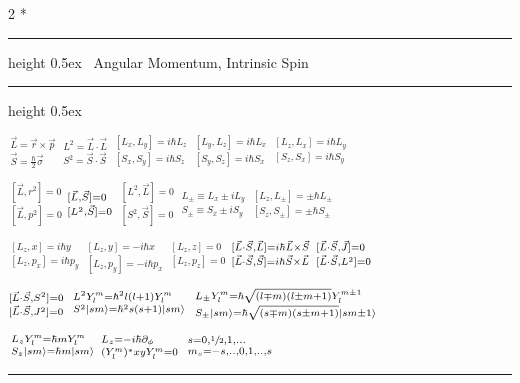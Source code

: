 \documentclass{article}
\makeatletter
\def\HrulefillThin{\leavevmode\leaders\hrule height 0.5ex \hfill\kern\z@}
\newcommand{\YgorUD}[2]{\,\!^{#1}_{#2}}
\renewcommand{\subsection}[1]{%
     \@startsection{subsection}{2}{0mm}{0.01ex}{0.01ex}{%
         \normalfont\Large\bfseries }*{%
         \noindent\HrulefillThin%
              ~#1~\HrulefillThin}}
\makeatother
\begin{document}
\begin{multicols}{2}
\subsection{Angular Momentum, Intrinsic Spin}

$\, ^{\vec{L}=\vec{r}\times\vec{p}}%
     _{\vec{S}=\frac{\hbar}{2}\vec{\sigma}}$%
    \hfill\textbullet\hfill%
    $\, ^{L^{ 2} =\vec{L}\cdot\vec{L}}%
     _{S^{ 2} =\vec{S}\cdot\vec{S}}$%
    \hfill\textbullet\hfill%
    $\, ^{[ L_{ x} ,L_{ y} ]=i\hbar L_{ z}}%
         _{[ S_{ x} ,S_{ y} ]=i\hbar S_{ z}}$%
    \hfill\textbullet\hfill%
    $\, ^{[ L_{ y} ,L_{ z} ]=i\hbar L_{ x}}%
         _{[ S_{ y} ,S_{ z} ]=i\hbar S_{ x}}$%
    \hfill\textbullet\hfill%
    $\, ^{[ L_{ z} ,L_{ x} ]=i\hbar L_{ y}}%
         _{[ S_{ z} ,S_{ x} ]=i\hbar S_{ y}}$
 
$\, ^{[ \vec{L} ,r^{ 2} ]=0}%
     _{[ \vec{L} ,p^{ 2} ]=0}$%
    \hfill\textbullet\hfill%
    $\YgorUD{[ \vec{L} ,\vec{S}]= 0}{%
         [ L^{ 2} ,\vec{S}]= 0}$%
    \hfill\textbullet\hfill%
    $\, ^{[ L^{ 2}  ,\vec{L}]=0}%
         _{[ S^{ 2}  ,\vec{S}]=0}$%
    \hfill\textbullet\hfill%
    $\, ^{L_{ \pm}\equiv L_{ x} \pm i L_{ y}}%
         _{S_{ \pm}\equiv S_{ x} \pm i S_{ y}}$%
    \hfill\textbullet\hfill%
    $\, ^{[ L_{ z} ,L_{ \pm} ]=\pm\hbar L_{ \pm}}%
         _{[ S_{ z} ,S_{ \pm} ]=\pm\hbar S_{ \pm}}$

$\, ^{[ L_{ z} ,x ]=i\hbar y}%
         _{[ L_{ z} ,p_{ x} ]=i\hbar p_{ y}}   $%
    \hfill\textbullet\hfill%
    $\, ^{[ L_{ z} ,y ]=- i\hbar x}%
         _{[ L_{ z} ,p_{ y} ]=- i\hbar p_{ x}}   $%
    \hfill\textbullet\hfill%
    $\, ^{[ L_{ z} ,z ]=0}%
         _{[ L_{ z} ,p_{ z} ]=0}   $
    \hfill\textbullet\hfill%
    $\YgorUD{[ \vec{L} \cdot \vec{S} ,\vec{L}]=i\hbar \vec{L} \times \vec{S} }{%
         [ \vec{L} \cdot \vec{S} ,\vec{S}]=i\hbar \vec{S} \times \vec{L} }$%
    \hfill\textbullet\hfill%
    $\YgorUD{[ \vec{L} \cdot \vec{S} ,\vec{J}]=0 }{%
         [ \vec{L} \cdot \vec{S} ,L^{ 2}]=0 }$%

$\YgorUD{[ \vec{L} \cdot \vec{S} ,S^{ 2}]=0 }{%
         [ \vec{L} \cdot \vec{S} ,J^{ 2}]=0 }$%
    \hfill\textbullet\hfill%
    $\, ^{L^{ 2}Y_{ l}^{ m} =\hbar^{2} l ( l + 1 )Y_{ l}^{ m}}%
     _{S^{2} \ket{ sm } = \hbar^{2}  s%
    ( s + 1 ) \ket{ sm }}$%
    \hfill\textbullet\hfill%
    $\, ^{L_{ \pm}Y_{ l}^{ m} =%
    \hbar \sqrt{ ( l \mp m ) ( l \pm m + 1 )} %
    Y_{ l}^{ m \pm 1}}%
         _{S_{ \pm} \ket{ sm } =%
    \hbar \sqrt{ ( s \mp m ) ( s \pm  m + 1 )} %
     \ket{ sm \pm 1 }}$%

$\, ^{L_{ z}Y_{ l}^{ m} = \hbar m Y_{ l}^{ m}}%
     _{S_{ z} \ket{ sm } = \hbar m  \ket{ sm }}$%
    \hfill\textbullet\hfill%
    $\YgorUD{%
        L_{ z} = - i\hbar\partial_{\phi}%
    }{%
        ( Y_{ l}^{ m} )^{ *} xy Y_{ l}^{ m} = 0%
    }$%
    \hfill\textbullet\hfill%
    $ \,^{s=0,\sfrac{1 }{2},1,...}%
     _{m_{ s}=-s,..,0,1,..,s}$
\hrule


\end{multicols}
\end{document}
